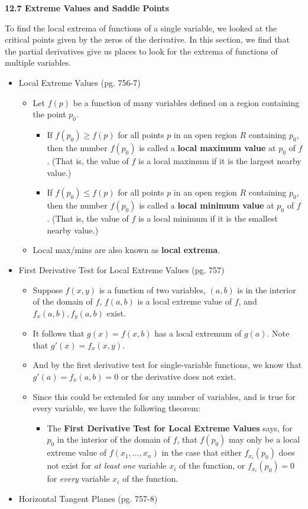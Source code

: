 \documentclass[12pt]{article}
\theoremstyle{plain}
\theoremstyle{definition}
\theoremstyle{remark}
\begin{document}
	\centerline{\bf 12.7 Extreme Values and Saddle Points}
	
	To find the local extrema of functions of a single variable, we looked at the critical points given by the zeros of the derivative. In this section, we find that the partial derivatives give us places to look for the extrema of functions of multiple variables.
	
	\begin{itemize}
	
	\item Local Extreme Values (pg. 756-7)
	
		\begin{itemize}
		\item Let $f(p)$ be a function of many variables defined on a region containing the point $p_0$.
			\begin{itemize}
			\item If $f(p_0)\geq f(p)$ for all points $p$ in an open region $R$ containing $p_0$, then the number $f(p_0)$ is called a \textbf{local maximum value} at $p_0$ of $f$. (That is, the value of $f$ is a local maximum if it is the largest nearby value.)
			\item If $f(p_0)\leq f(p)$ for all points $p$ in an open region $R$ containing $p_0$, then the number $f(p_0)$ is called a \textbf{local minimum value} at $p_0$ of $f$. (That is, the value of $f$ is a local minimum if it is the smallest nearby value.)
			\end{itemize}
		\item Local max/mins are also known as \textbf{local extrema}.
		\end{itemize}
		
	\item First Derivative Test for Local Extreme Values (pg. 757)
	
		\begin{itemize}
		\item Suppose $f(x,y)$ is a function of two variables, $(a,b)$ is in the interior of the domain of $f$, $f(a,b)$ is a local extreme value of $f$, and $f_x(a,b),f_y(a,b)$ exist.
		\item It follows that $g(x)=f(x,b)$ has a local extremum of $g(a)$. Note that $g'(x)=f_x(x,y)$.
		\item And by the first derivative test for single-variable functions, we know that $g'(a)=f_x(a,b)=0$ or the derivative does not exist.
		\item Since this could be extended for any number of variables, and is true for every variable, we have the following theorem:
			\begin{itemize}
			\item The \textbf{First Derivative Test for Local Extreme Values} says, for $p_0$ in the interior of the domain of $f$, that $f(p_0)$ may only be a local extreme value of $f(x_1,\dots,x_n)$ in the case that either $f_{x_i}(p_0)$ does not exist for \textit{at least one} variable $x_i$ of the function, or $f_{x_i}(p_0)=0$ for \textit{every} variable $x_i$ of the function.
			\end{itemize} 
		\end{itemize}
	\newpage
	\item Horizontal Tangent Planes (pg. 757-8)
	

\end{itemize}
\end{document}
